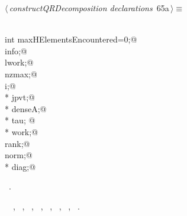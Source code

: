\documentclass{article}
\begin{document}
\begin{flushleft} \small
\begin{minipage}{\linewidth}\label{scrap96}\raggedright\small
{} $\langle\,${\itshape constructQRDecomposition declarations}\nobreak\ {\footnotesize {65a}}$\,\rangle\equiv$
\vspace{-1ex}
\begin{list}{}{} \item
\mbox{}\verb@@\\
\mbox{}\verb@static int maxHElementsEncountered=0;@\\
\mbox{}\verb@int info;@\\
\mbox{}\verb@int lwork;@\\
\mbox{}\verb@int nzmax;@\\
\mbox{}\verb@int i;@\\
\mbox{}\verb@int * jpvt;@\\
\mbox{}\verb@double * denseA;@\\
\mbox{}\verb@double * tau; @\\
\mbox{}\verb@double * work;@\\
\mbox{}\verb@int rank;@\\
\mbox{}\verb@int norm;@\\
\mbox{}\verb@double * diag;@\\
\mbox{}\verb@@{\NWsep}
\end{list}
\vspace{-1.5ex}
\footnotesize
\begin{list}{}{\setlength{\itemsep}{-\parsep}\setlength{\itemindent}{-\leftmargin}}
\item \NWtxtMacroRefIn\ .
\item \NWtxtIdentsUsed\nobreak\  \verb@diag@\nobreak\ , \verb@i@\nobreak\ , \verb@info@\nobreak\ , \verb@lwork@\nobreak\ , \verb@maxHElementsEncountered@\nobreak\ , \verb@norm@\nobreak\ , \verb@nzmax@\nobreak\ , \verb@work@\nobreak\ .
\item{}
\end{list}
\end{minipage}\vspace{4ex}
\end{flushleft}
\end{document}
